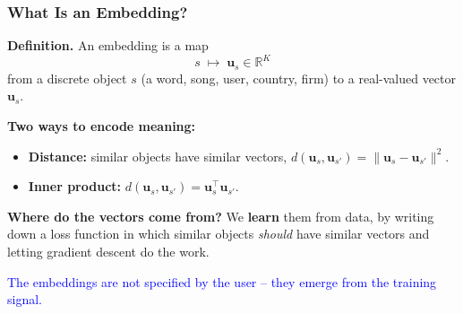 \documentclass[notes,11pt, aspectratio=169]{beamer}
\newcommand{\vu}{\mathbf{u}}
\newcommand{\R}{\mathbb{R}}
\begin{document}
\begin{frame}
\frametitle{What Is an Embedding?}

\textbf{Definition.} An embedding is a map
\[
    s \;\longmapsto\; \vu_s \in \R^K
\]
from a discrete object $s$ (a word, song, user, country, firm) to a real-valued vector $\vu_s$.

\vspace{8pt}
\textbf{Two ways to encode meaning:}
\begin{itemize}
    \item \textbf{Distance:} similar objects have similar vectors, $d(\vu_s, \vu_{s'}) = \|\vu_s - \vu_{s'}\|^2$.
    \item \textbf{Inner product:} $d(\vu_s, \vu_{s'}) = \vu_s^\top \vu_{s'}$.
\end{itemize}

\vspace{8pt}
\textbf{Where do the vectors come from?} We \textbf{learn} them from data, by writing down a loss function in which similar objects \emph{should} have similar vectors and letting gradient descent do the work.

\vspace{6pt}
\textcolor{blue}{The embeddings are not specified by the user -- they emerge from the training signal.}
\end{frame}
\end{document}
